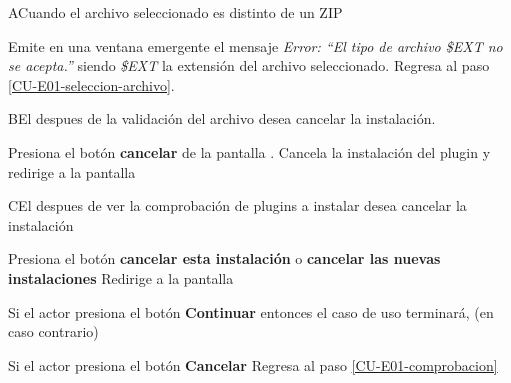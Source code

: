 \begin{UCtrayectoriaA}{A}{Cuando el archivo seleccionado es distinto de un ZIP}

  \Sistema Emite en una ventana emergente el mensaje {\it Error: ``El tipo de
           archivo \$EXT no se acepta.''} siendo {\it\$EXT} la extensión del
           archivo seleccionado.
  \Sistema Regresa al paso \ref{CU-E01-seleccion-archivo}.

\end{UCtrayectoriaA}

\begin{UCtrayectoriaA}%
{B}{El  despues de la validación del archivo desea cancelar la instalación.}

    \Actor Presiona el botón {\bf cancelar} de la pantalla .
    \Sistema Cancela la instalación del plugin y redirige a la pantalla 

\end{UCtrayectoriaA}

\begin{UCtrayectoriaA}%
{C}{El  despues de ver la comprobación de plugins a instalar desea cancelar
la instalación}

    \Actor Presiona el botón {\bf cancelar esta instalación} o {\bf cancelar las nuevas instalaciones}
    \Sistema Redirige a la pantalla 

    \Actor Si el actor presiona el botón {\bf Continuar} entonces 
    \UCpaso[--] el caso de uso terminará, (en caso contrario)

    \Actor Si el actor presiona el botón {\bf Cancelar}
    \Sistema Regresa al paso \ref{CU-E01-comprobacion}
\end{UCtrayectoriaA}



%
%


